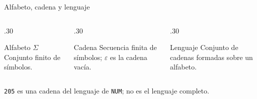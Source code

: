 \documentclass[11pt,spanish]{beamer}
\begin{document}
\begin{frame}{Alfabeto, cadena y lenguaje}
\vfill

\begin{columns}[T,onlytextwidth]
\begin{column}{.30\textwidth}
\begin{block}{Alfabeto \(\Sigma\)}
\small Conjunto finito de símbolos.
\end{block}
\end{column}
\begin{column}{.30\textwidth}
\begin{block}{Cadena}
\small Secuencia finita de símbolos; \(\varepsilon\) es la cadena vacía.
\end{block}
\end{column}
\begin{column}{.30\textwidth}
\begin{block}{Lenguaje}
\small Conjunto de cadenas formadas sobre un alfabeto.
\end{block}
\end{column}
\end{columns}

\bigskip

\begin{center}
\end{center}

\bigskip
\begin{center}
\small \texttt{205} es una cadena del lenguaje de \texttt{NUM}; no es el lenguaje completo.
\end{center}

\vfill
\end{frame}
\end{document}
